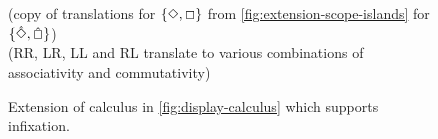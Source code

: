 \begin{figure}
\begin{mdframed}
    \vspace*{\baselineskip}%
    \begin{pfbox}
    \end{pfbox}
    \begin{pfbox}
    \end{pfbox}
    \\
    \vspace*{\baselineskip}
    \hrulefill
    \\
    \vspace*{\baselineskip}
    (copy of translations for $\{\Diamond,\Box\}$ from
    \autoref{fig:extension-scope-islands} for $\{\hat{\Diamond},\hat{\Box}\}$)
    \\
    \vspace*{\baselineskip}
    ({RR\diIfx}, {LR\diIfx}, {LL\diIfx} and {RL\diIfx} translate to
    various combinations of associativity and commutativity)
    \\
    \vspace*{\baselineskip}
  \end{mdframed}
  \caption{Extension of calculus in \autoref{fig:display-calculus}
    which supports infixation.}
  \label{fig:extension-infixation}
\end{figure}
%
